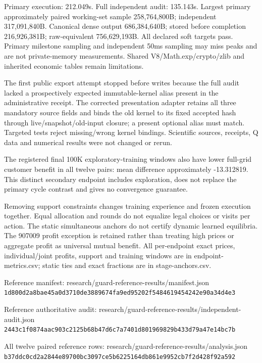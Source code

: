 \documentclass[a4paper,10pt]{article}
\begin{document}
Primary execution: 212.049s. Full independent audit: 135.143s. Largest primary approximately paired working-set sample 258,764,800B; independent 317,091,840B. Canonical dense output 686,384,640B; stored before completion 216,926,381B; raw-equivalent 756,629,193B. All declared soft targets pass. Primary milestone sampling and independent 50ms sampling may miss peaks and are not private-memory measurements. Shared V8/Math.exp/crypto/zlib and inherited economic tables remain limitations.
\par

The first public export attempt stopped before writes because the full audit lacked a prospectively expected immutable-kernel alias present in the administrative receipt. The corrected presentation adapter retains all three mandatory source fields and binds the old kernel to its fixed accepted hash through live/snapshot/old-input closure; a present optional alias must match. Targeted tests reject missing/wrong kernel bindings. Scientific sources, receipts, Q data and numerical results were not changed or rerun.
\par

The registered final 100K exploratory-training windows also have lower full-grid customer benefit in all twelve pairs: mean difference approximately -13.312819. This distinct secondary endpoint includes exploration, does not replace the primary cycle contrast and gives no convergence guarantee.
\par

Removing support constraints changes training experience and frozen execution together. Equal allocation and rounds do not equalize legal choices or visits per action. The static simultaneous anchors do not certify dynamic learned equilibria. The 907009 profit exception is retained rather than treating high prices or aggregate profit as universal mutual benefit. All per-endpoint exact prices, individual/joint profits, support and training windows are in endpoint-metrics.csv; static ties and exact fractions are in stage-anchors.csv.
\par

{\fontsize{7.7}{9.5}\selectfont Reference manifest: research/guard-reference-results/manifest.json\\\nolinkurl{1d800d2a8bae45a0d3710de3889674fa9ed95202f5484619454242e90a34d4e3}\par}

{\fontsize{7.7}{9.5}\selectfont Reference authoritative audit: research/guard-reference-results/independent-audit.json\\\nolinkurl{2443c1f0874aac903c2125b68b47d6c7a7401d801969829b433d79a47e14bc7b}\par}

{\fontsize{7.7}{9.5}\selectfont All twelve paired reference rows: research/guard-reference-results/analysis.json\\\nolinkurl{b37ddc0cd2a2844e89700bc3097ce5b6225164db861e9952cb7f2d428f92a592}\par}
\end{document}
